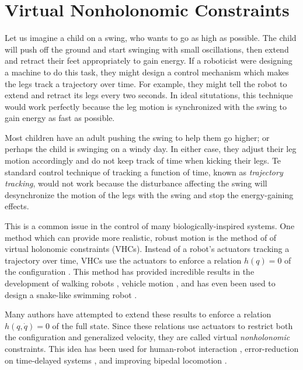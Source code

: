 \section{Virtual Nonholonomic Constraints}
Let us imagine a child on a swing, who wants to go as high as possible. The
child will push off the ground and start swinging with small oscillations,
then extend and retract their feet appropriately to gain energy. 
If a roboticist were designing a machine to do this task, they might design a
control mechanism which makes the legs track a trajectory over time. For
example, they might tell the robot to extend and retract its legs every two
seconds. In ideal situtations, this technique would work perfectly because the
leg motion is synchronized with the swing to gain energy as fast as possible.

Most children have an adult pushing the swing to help them go higher; or perhaps
the child is swinging on a windy day. In either case, they adjust their leg
motion accordingly and do not keep track of time when kicking their legs. Te
standard control technique of tracking a function of time, known as
\textit{trajectory tracking}, would not work because the disturbance affecting
the swing will desynchronize the motion of the legs with the swing and stop the
energy-gaining effects.

This is a common issue in the control of many biologically-inspired systems. 
One method which can provide more realistic, robust motion is the method of
of virtual holonomic constraints (VHCs). Instead of a robot's actuators tracking
a trajectory over time, VHCs use the actuators to enforce a relation
\(h(q) = 0\) of the configuration \cite{vhcs_for_el_systems}. 
This method has provided incredible results in the development of 
walking robots \cite{vhc_robotic_walking, vhc_stable_walking}, 
vehicle motion \cite{vhc_bicycle, vhc_helicopter}, 
and has even been used to design a snake-like swimming robot
\cite{vhc_snake}.

Many authors have attempted to extend these results to enforce a relation 
\(h(q,\dot{q}) = 0\) of the full state. Since these relations use actuators to
restrict both the configuration and generalized velocity, they are called
virtual \textit{nonholonomic} constraints. This idea has been used for
human-robot interaction
\cite{vnhc_human_robot_cooperation,psd_based_vnhc_redundant_manipulator,haptic_vnhc},
error-reduction on time-delayed systems \cite{vnhc_time_delay_teleop},
and improving bipedal locomotion \cite{nhvc_dynamic_walking,
hybrid_zero_dynamics_bipedal_nhvcs,nhvc_incline_walking,output_nhvc_bipedal_control}.

